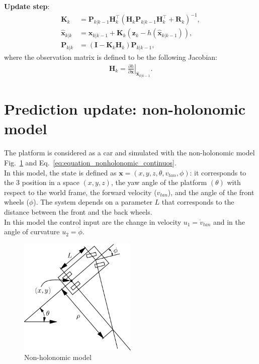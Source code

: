 \textbf{Update step}: 
\begin{subequations}
\begin{align}
\boldsymbol{K}_{k} &= \boldsymbol{P}_{k|k-1} \boldsymbol{H}_{k}^{\top }(\boldsymbol{H}_{k} \boldsymbol{P}_{k|k-1} \boldsymbol{H}_{k}^{\top }+ \boldsymbol{R}_{k})^{-1}, \\[10pt]
\hat{\boldsymbol{x}}_{k|k} &= \hat{\boldsymbol{x}}_{k|k-1} + \boldsymbol{K}_{k} (\boldsymbol{z}_{k}-h(\hat{\boldsymbol{x}}_{k|k-1})) ,\\[10pt]
\boldsymbol{P}_{k|k} &=(\boldsymbol{I}-\boldsymbol{K}_{k}\boldsymbol{H}_{k})\boldsymbol{P}_{k|k-1} ,
\end{align}
\end{subequations}
where the observation matrix is defined to be the following Jacobian:
\begin{align}
\boldsymbol{H}_{k} = \left.{\frac{\partial h}{\partial {\boldsymbol{x}}}} \right \vert_{\hat{\boldsymbol{x}}_{k|k-1}}.
\end{align}

\section{Prediction update: non-holonomic model}
The platform is considered as a car and simulated with the non-holonomic model Fig.~\ref{fig:nonholonomicmodel} and Eq.~\ref{eq:equation_nonholonomic_continuos}.\\
In this model, the state is defined as $\boldsymbol{x} = (x, y, z,\theta , v_{tan}, \phi)$: it corresponds to the 3 position in a space $(x,y,z)$,  the yaw angle of the platform $(\theta)$ with respect to the world frame, the forward velocity ($v_{tan}$), and the angle of the front wheels ($\phi$). The system depends on a parameter $L$ that corresponds to the distance between the front and the back wheels.\\
In this model the control input are the change in velocity $u_1 = \dot{v}_{tan}$ and in the angle of curvature $u_2 = \dot{\phi}$. \\
\begin{figure}[!ht]
    \centering
    \includegraphics[width=0.5\textwidth]{img/non_holonomic_model.png}
    \caption{Non-holonomic model}
    \label{fig:nonholonomicmodel}
\end{figure}

